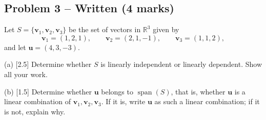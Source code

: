 \documentclass[11pt,a4paper]{article}
\begin{document}
\subsection*{Problem 3 -- Written (4 marks)}
Let $S=\{\mathbf{v}_1,\mathbf{v}_2,\mathbf{v}_3\}$ be the set of vectors in $\mathbb{R}^3$ given by\[\mathbf{v}_1=(1,2,1),\qquad \mathbf{v}_2=(2,1,-1),\qquad \mathbf{v}_3=(1,1,2),\]and let $\mathbf{u}=(4,3,-3)$.\par (a) [2.5] Determine whether $S$ is linearly independent or linearly dependent. Show all your work.\par (b) [1.5] Determine whether $\mathbf{u}$ belongs to $\operatorname{span}(S)$, that is, whether $\mathbf{u}$ is a linear combination of $\mathbf{v}_1,\mathbf{v}_2,\mathbf{v}_3$. If it is, write $\mathbf{u}$ as such a linear combination; if it is not, explain why.\par
\end{document}
